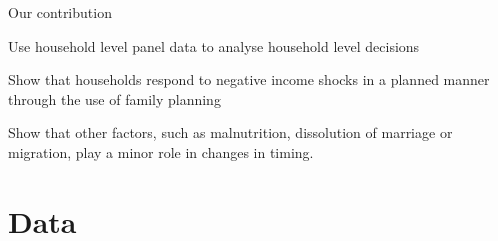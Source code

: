 \documentclass[red]{beamer}
\begin{document}
\begin{frame}{Our contribution}

Use household level panel data to analyse household level decisions

\bigskip

Show that households respond to negative income shocks in a planned manner through
the use of family planning

\bigskip

Show that other factors, such as malnutrition, dissolution of marriage or migration, play
a minor role in changes in timing.

\end{frame}

% 
% 


\section{Data}
\subsection{}

% 
% 
\end{document}
